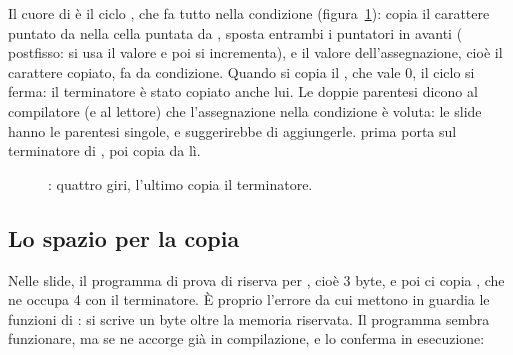 Il cuore di  è il ciclo , che
fa tutto nella condizione (figura~\ref{fig:strcpy}): copia il carattere
puntato da  nella cella puntata da , sposta entrambi i
puntatori in avanti (\code{++} postfisso: si usa il valore e poi si
incrementa), e il valore dell'assegnazione, cioè il carattere copiato,
fa da condizione. Quando si copia il , che vale 0,
il ciclo si ferma: il terminatore è stato copiato anche lui. Le doppie
parentesi dicono al compilatore (e al lettore) che l'assegnazione nella
condizione è voluta: le slide hanno le parentesi singole, e 
suggerirebbe di aggiungerle.  prima porta  sul
terminatore di , poi copia da lì.

\begin{figure}[H]
  \centering
  \caption{: quattro giri, l'ultimo copia il
           terminatore.}
  \label{fig:strcpy}
\end{figure}

\subsection{Lo spazio per la copia}

Nelle slide, il programma di prova di  riserva per 
, cioè 3 byte, e poi ci copia , che
ne occupa 4 con il terminatore. È proprio l'errore da cui mettono in guardia
le funzioni di : si scrive un byte oltre la memoria riservata.
Il programma sembra funzionare, ma  se ne accorge già in
compilazione, e  lo conferma in esecuzione:

